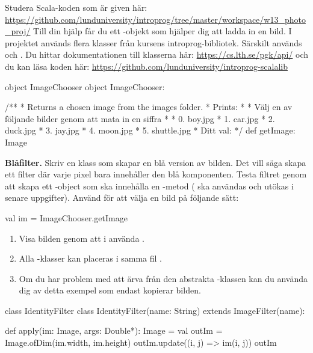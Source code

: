 Studera Scala-koden som är given här: \url{https://github.com/lunduniversity/introprog/tree/master/workspace/w13_photo_proj/}
Till din hjälp får du ett -objekt som hjälper dig att ladda in en bild. 
I projektet används flera klasser från kursens introprog-bibliotek. Särskilt används  och .
Du hittar dokumentationen till klasserna här: \url{https://cs.lth.se/pgk/api/} och du kan läsa koden här: \url{https://github.com/lunduniversity/introprog-scalalib}

\begin{ScalaSpec}{object ImageChooser}
	object ImageChooser:

		/**
		* Returns a chosen image from the images folder.
		* Prints:	
		*
		*	Välj en av följande bilder genom att mata in en siffra
		*
		*	0. boy.jpg
		*	1. car.jpg
		*	2. duck.jpg
		*	3. jay.jpg
		*	4. moon.jpg
		*	5. shuttle.jpg
		*	Ditt val: 
		*/
		def getImage: Image
\end{ScalaSpec}


\Task \textbf{Blåfilter.} Skriv en klass  som skapar en blå version av bilden. 
Det vill säga skapa ett filter där varje pixel bara innehåller den blå komponenten. 
Testa filtret genom att skapa ett -object som ska innehålla en 
-metod ( ska användas och utökas i senare uppgifter). 
Använd  för att välja en bild på följande sätt:
\begin{Code}
	val im = ImageChooser.getImage
\end{Code}
\begin{enumerate}
	\item Visa bilden genom att i  använda . 
	\item Alla -klasser kan placeras i samma fil .
	\item Om du har problem med att ärva från den abstrakta -klassen kan du använda dig av detta exempel som endast kopierar bilden.
\end{enumerate}
\begin{ScalaSpec}{class IdentityFilter}
	class IdentityFilter(name: String) extends ImageFilter(name):
	
		def apply(im: Image, args: Double*): Image = 
			val outIm = Image.ofDim(im.width, im.height)
			outIm.update((i, j) => im(i, j))
			outIm
\end{ScalaSpec}



